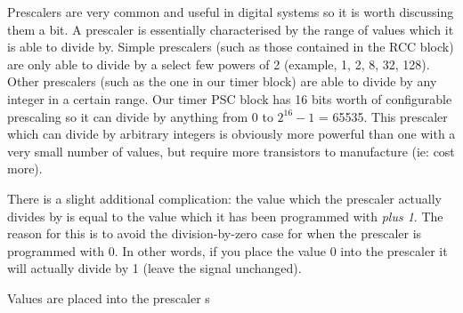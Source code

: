Prescalers are very common and useful in digital systems so it is worth discussing them a bit. A prescaler is essentially characterised by the range of values which it is able to divide by. Simple prescalers (such as those contained in the RCC block) are only able to divide by a select few powers of 2 (example, 1, 2, 8, 32, 128). Other prescalers (such as the one in our timer block) are able to divide by any integer in a certain range. Our timer PSC block has 16 bits worth of configurable prescaling so it can divide by anything from 0 to $2^{16} - 1$ = 65535. This prescaler which can divide by arbitrary integers is obviously more powerful than one with a very small number of values, but require more transistors to manufacture (ie: cost more). 

There is a slight additional complication: the value which the prescaler actually divides by is equal to the value which it has been programmed with \emph{plus 1}. The reason for this is to avoid the division-by-zero case for when the prescaler is programmed with 0. In other words, if you place the value 0 into the prescaler it will actually divide by 1 (leave the signal unchanged). 

Values are placed into the prescaler s
